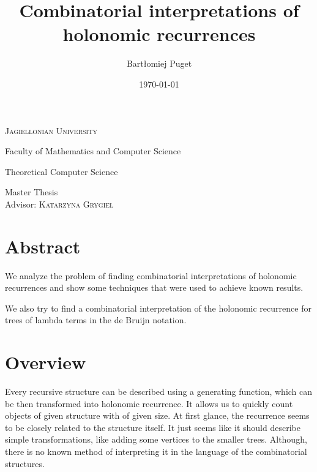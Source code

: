 \documentclass[final]{article}
\title{Combinatorial interpretations of holonomic recurrences}
\author{Bartłomiej Puget}
\date{\today}
\theoremstyle{definition}
\theoremstyle{remark}
\begin{document}
\begin{titlepage}
	\begin{center}
	\textsc{\LARGE Jagiellonian University}

	\Large Faculty of Mathematics and Computer Science

	\Large Theoretical Computer Science

	\vfill

	\vspace{1cm}
	\hrulefill
	\vspace{0.5cm}

    \makeatletter
    \huge \textsc{\@title}
    \makeatother

	\vspace{0.2cm}
	\hrulefill

	\vspace{1cm}
    \makeatletter
	\textsc{\Large \@author}
    \makeatother

	\vspace{1cm}
    \normalsize

	Master Thesis\\
	Advisor: \textsc{Katarzyna Grygiel}

	\vfill

    \makeatletter
    \@date
    \makeatother
	\end{center}
\end{titlepage}

\section*{Abstract}%
\label{sec:abstract}

We analyze the problem of finding combinatorial interpretations of holonomic recurrences and show some techniques that were used to achieve known results.

We also try to find a combinatorial interpretation of the holonomic recurrence for trees of lambda terms in the de Bruijn notation.

\clearpage

\tableofcontents
\clearpage

\section{Overview}%

Every recursive structure can be described using a generating function, which can be then transformed into holonomic recurrence. It allows us to quickly count objects of given structure with of given size. At first glance, the recurrence seems to be closely related to the structure itself. It just seems like it should describe simple transformations, like adding some vertices to the smaller trees. Although, there is no known method of interpreting it in the language of the combinatorial structures.
\end{document}
